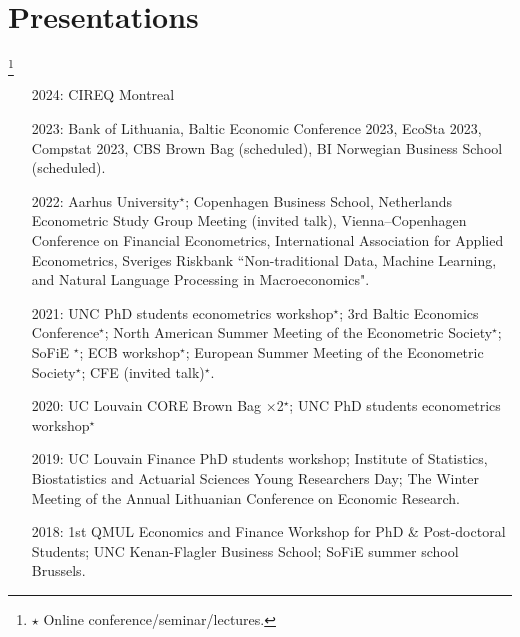 \documentclass[10pt]{article}
\newcommand\blfootnote[1]{%
	\begingroup
	\renewcommand\thefootnote{}\footnote{#1}%
	\addtocounter{footnote}{-1}%
	\endgroup
}
\newcommand{\thestar}{{\Large{\color{blue}\ensuremath{\star}} }}
\newcommand{\thestarnogap}{{\Large{\color{blue}\ensuremath{^\star}}}}
\begin{document}
	\smallskip

	
	
%	
%	
%	
	
	\section*{Presentations}
	\vspace{-2.5em}
	
	\blfootnote{\thestar Online conference/seminar/lectures.} 
	\begin{itemize}[leftmargin=4.5em]
		\setlength\itemsep{-0.1em}
		\item[2024:] CIREQ Montreal
		\item[2023:] Bank of Lithuania, Baltic Economic Conference 2023, EcoSta 2023, Compstat 2023, CBS Brown Bag (scheduled), BI Norwegian Business School (scheduled).
		\item[2022:] Aarhus University\thestarnogap; Copenhagen Business School, Netherlands Econometric Study Group Meeting (invited talk), Vienna–Copenhagen Conference on Financial Econometrics, International Association for Applied Econometrics, Sveriges Riskbank ``Non-traditional Data, Machine Learning, and Natural Language Processing in Macroeconomics".
		\item[2021:] UNC PhD students econometrics workshop\thestarnogap; 3rd Baltic Economics Conference\thestarnogap; North American Summer Meeting of the Econometric Society\thestarnogap; SoFiE \thestarnogap; ECB workshop\thestarnogap; European Summer Meeting of the Econometric Society\thestarnogap; CFE (invited talk)\thestarnogap.
		\item[2020:] UC Louvain CORE Brown Bag $\times$2\thestarnogap; UNC PhD students econometrics workshop\thestarnogap
		\item[2019:] UC Louvain Finance PhD students workshop; Institute of Statistics, Biostatistics and Actuarial Sciences Young Researchers Day; The Winter Meeting of the Annual Lithuanian Conference on Economic Research.
		\item[2018:] 1st QMUL Economics and Finance Workshop for PhD \& Post-doctoral Students; UNC Kenan-Flagler Business School; SoFiE summer school Brussels.
	\end{itemize}
\end{document}
